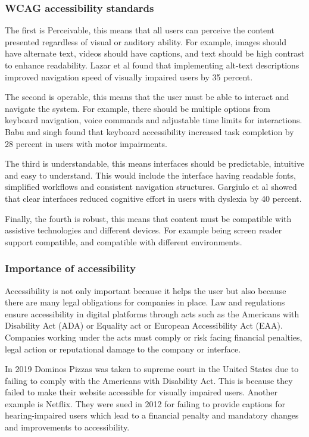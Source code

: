 \documentclass[]{project_final}
\begin{document}
\subsubsection{WCAG accessibility standards}

The first is Perceivable, this means that all users can perceive the content presented regardless of visual or auditory ability. For example, images should have alternate text, videos should have captions, and text should be high contrast to enhance readability. Lazar et al found that implementing alt-text descriptions improved navigation speed of visually impaired users by 35 percent.

The second is operable, this means that the user must be able to interact and navigate the system. For example, there should be multiple options from keyboard navigation, voice commands and adjustable time limits for interactions.  Babu and singh found that keyboard accessibility increased task completion by 28 percent in users with motor impairments.\cite{babu_understanding_2010}

The third is understandable, this means interfaces should be predictable, intuitive and easy to understand. This would include the interface having readable fonts, simplified workflows and consistent navigation structures. Gargiulo et al showed that clear interfaces reduced cognitive effort in users with dyslexia by 40 percent.

Finally, the fourth is robust, this means that content must be compatible with assistive technologies and different devices. For example being screen reader support compatible, and compatible with different environments.\cite{noauthor_web_nodate}

\subsubsection{Importance of accessibility}

Accessibility is not only important because it helps the user but also because there are many legal obligations for companies in place. Law and regulations ensure accessibility in digital platforms through acts such as the Americans with Disability Act (ADA) or Equality act or European Accessibility Act (EAA). Companies working under the acts must comply or risk facing financial penalties, legal action or reputational damage to the company or interface.\cite{gada_importance_nodate}

In 2019 Dominos Pizzas was taken to supreme court in the United States due to failing to comply with the Americans with Disability Act. This is because they failed to make their website accessible for visually impaired users.
Another example is Netflix. They were sued in 2012 for failing to provide captions for hearing-impaired users which lead to a financial penalty and mandatory changes and
improvements to accessibility.\cite{higgins_supreme_2019}
\end{document}
